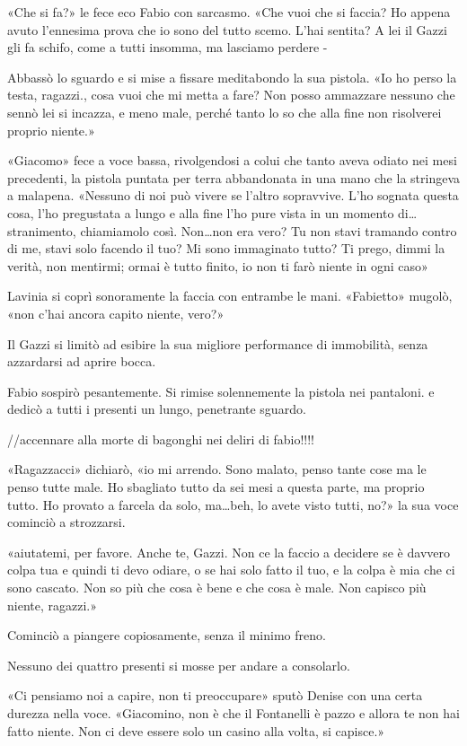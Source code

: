 «Che si fa?» le fece eco Fabio con sarcasmo. «Che vuoi che si faccia? Ho appena avuto l'ennesima prova che io sono del tutto scemo. L'hai sentita? A lei il Gazzi gli fa schifo, come a tutti insomma, ma lasciamo perdere -

Abbassò lo sguardo e si mise a fissare meditabondo la sua pistola. «Io ho perso la testa, ragazzi., cosa vuoi che mi metta a fare? Non posso ammazzare nessuno che sennò lei si incazza, e meno male, perché tanto lo so che alla fine non risolverei proprio niente.»

«Giacomo» fece a voce bassa, rivolgendosi a colui che tanto aveva odiato nei mesi precedenti, la pistola puntata per terra abbandonata in una mano che la stringeva a malapena. «Nessuno di noi può vivere se l'altro sopravvive. L'ho sognata questa cosa, l'ho pregustata a lungo e alla fine l'ho pure vista in un momento di\ldots stranimento, chiamiamolo così. Non\ldots non era vero? Tu non stavi tramando contro di me, stavi solo facendo il tuo? Mi sono immaginato tutto? Ti prego, dimmi la verità, non mentirmi; ormai è tutto finito, io non ti farò niente in ogni caso»

Lavinia si coprì sonoramente la faccia con entrambe le mani. «Fabietto» mugolò, «non c'hai ancora capito niente, vero?»

Il Gazzi si limitò ad esibire la sua migliore performance di immobilità, senza azzardarsi ad aprire bocca.

Fabio sospirò pesantemente. Si rimise solennemente la pistola nei pantaloni. e dedicò a tutti i presenti un lungo, penetrante sguardo.

//accennare alla morte di bagonghi nei deliri di fabio!!!!

«Ragazzacci» dichiarò, «io mi arrendo. Sono malato, penso tante cose ma le penso tutte male. Ho sbagliato tutto da sei mesi a questa parte, ma proprio tutto. Ho provato a farcela da solo, ma\ldots beh, lo avete visto tutti, no?» la sua voce cominciò a strozzarsi.

«aiutatemi, per favore. Anche te, Gazzi. Non ce la faccio a decidere se è davvero colpa tua e quindi ti devo odiare, o se hai solo fatto il tuo, e la colpa è mia che ci sono cascato. Non so più che cosa è bene e che cosa è male. Non capisco più niente, ragazzi.»

Cominciò a piangere copiosamente, senza il minimo freno. 

Nessuno dei quattro presenti si mosse per andare a consolarlo.

«Ci pensiamo noi a capire, non ti preoccupare» sputò Denise con una certa durezza nella voce. «Giacomino, non è che il Fontanelli è pazzo e allora te non hai fatto niente. Non ci deve essere solo un casino alla volta, si capisce.»

